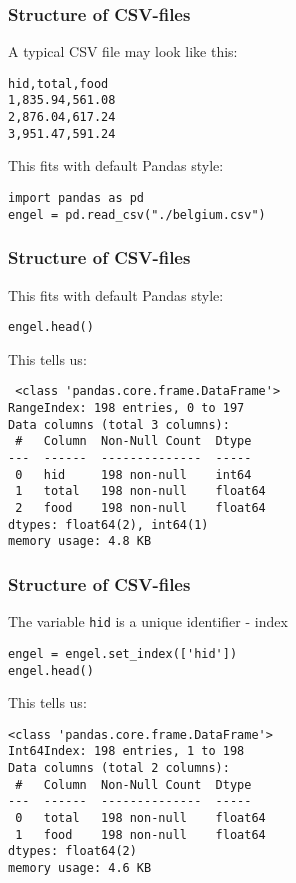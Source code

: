 \documentclass[aspectratio=169,t]{beamer}
\begin{document}
\begin{frame}[fragile]
 \frametitle{Structure of CSV-files}

 A typical CSV file may look like this:
 \begin{verbatim}
hid,total,food
1,835.94,561.08
2,876.04,617.24
3,951.47,591.24
 \end{verbatim}

 This fits with default Pandas style:
\begin{verbatim}
import pandas as pd
engel = pd.read_csv("./belgium.csv")
\end{verbatim}


\end{frame}


\begin{frame}[fragile]
 \frametitle{Structure of CSV-files}

 This fits with default Pandas style:
\begin{verbatim}
engel.head()
\end{verbatim}

This tells us:
\begin{verbatim}
 <class 'pandas.core.frame.DataFrame'>
RangeIndex: 198 entries, 0 to 197
Data columns (total 3 columns):
 #   Column  Non-Null Count  Dtype
---  ------  --------------  -----
 0   hid     198 non-null    int64
 1   total   198 non-null    float64
 2   food    198 non-null    float64
dtypes: float64(2), int64(1)
memory usage: 4.8 KB
\end{verbatim}


\end{frame}


\begin{frame}[fragile]
 \frametitle{Structure of CSV-files}

 The variable \texttt{hid} is a unique identifier - index
\begin{verbatim}
engel = engel.set_index(['hid'])
engel.head()
\end{verbatim}

This tells us:
\begin{verbatim}
<class 'pandas.core.frame.DataFrame'>
Int64Index: 198 entries, 1 to 198
Data columns (total 2 columns):
 #   Column  Non-Null Count  Dtype
---  ------  --------------  -----
 0   total   198 non-null    float64
 1   food    198 non-null    float64
dtypes: float64(2)
memory usage: 4.6 KB
\end{verbatim}

\end{frame}
\end{document}
